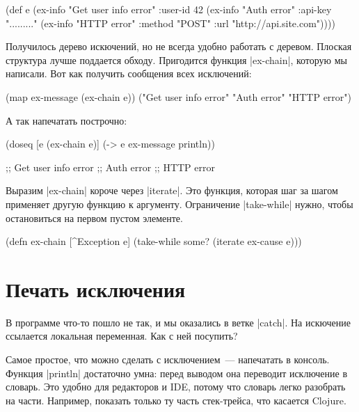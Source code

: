 \begin{english}
  \begin{clojure}
(def e
  (ex-info
   "Get user info error"
   {:user-id 42}
   (ex-info "Auth error"
            {:api-key "........."}
            (ex-info "HTTP error"
                     {:method "POST"
                      :url "http://api.site.com"}))))
  \end{clojure}
\end{english}

Получилось дерево искючений, но не всегда удобно работать с деревом. Плоская
структура лучше поддается обходу. Пригодится функция \spverb|ex-chain|, которую
мы написали. Вот как получить сообщения всех исключений:

\begin{english}
  \begin{clojure}
(map ex-message (ex-chain e))
("Get user info error" "Auth error" "HTTP error")
  \end{clojure}
\end{english}

\noindent
А так напечатать построчно:

\begin{english}
  \begin{clojure}
(doseq [e (ex-chain e)]
  (-> e ex-message println))

;; Get user info error
;; Auth error
;; HTTP error
  \end{clojure}
\end{english}

Выразим \spverb|ex-chain| короче через \spverb|iterate|. Это функция, которая
шаг за шагом применяет другую функцию к аргументу. Ограничение
\spverb|take-while| нужно, чтобы остановиться на первом пустом элементе.

\begin{english}
  \begin{clojure}
(defn ex-chain [^Exception e]
  (take-while some? (iterate ex-cause e)))
  \end{clojure}
\end{english}

\section{Печать исключения}

В программе что-то пошло не так, и мы оказались в ветке \spverb|catch|. На
искючение ссылается локальная переменная. Как с ней посупить?

Самое простое, что можно сделать с исключением~--- напечатать в консоль. Функция
\spverb|println| достаточно умна: перед выводом она переводит исключение в
словарь. Это удобно для редакторов и IDE, потому что словарь легко разобрать на
части. Например, показать только ту часть стек-трейса, что касается Clojure.

